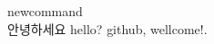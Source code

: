 \documentclass{article}
\newcommand{\hello}{hello?}
\newcommand{\customhello}[1]{{#1}, wellcome!.}
\newcommand{\kohello}{안녕하세요}
\begin{document}
newcommand
\\
\kohello
\hello
\newline
\customhello{github}
\end{document}
